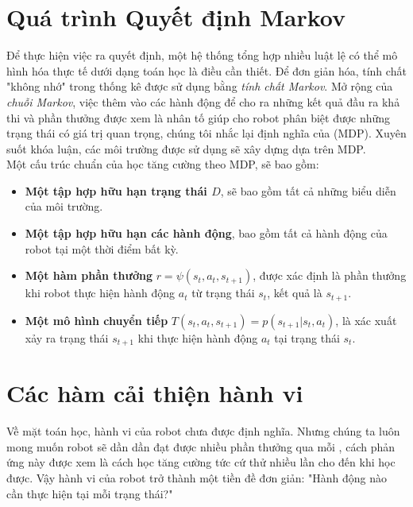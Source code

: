 \section{Quá trình Quyết định Markov}\label{MDP}
Để thực hiện việc ra quyết định, một hệ thống tổng hợp nhiều luật lệ có thể mô hình hóa thực tế dưới dạng toán học là điều cần thiết. Để đơn giản hóa, tính chất "không nhớ" trong thống kê được sử dụng bằng \textit{tính chất Markov}\cite{MarkovProperty}. Mở rộng của  \textit{chuỗi Markov}, việc thêm vào các hành động để cho ra những kết quả đầu ra khả thi và phần thưởng được xem là nhân tố giúp cho robot phân biệt được những trạng thái có giá trị quan trọng, chúng tôi nhắc lại định nghĩa của 
(MDP)\cite{AIbook}. Xuyên suốt khóa luận, các môi trường được sử dụng sẽ xây dựng  dựa trên MDP.\\
Một cấu trúc chuẩn của học tăng cường theo MDP, sẽ bao gồm:
\begin{itemize}
    \item \textbf{Một tập hợp hữu hạn trạng thái $D$}, sẽ bao gồm tất cả những biểu diễn của môi trường.
    \item \textbf{Một tập hợp hữu hạn các hành động}, bao gồm tất cả hành động của robot tại một thời điểm bất kỳ.
    \item \textbf{Một hàm phần thưởng} $r = \psi(s_t, a_t, s_{t+1})$, được xác định là phần thưởng khi robot thực hiện hành động $a_t$ từ trạng thái $s_t$, kết quả là $s_{t+1}$.
    \item \textbf{Một mô hình chuyển tiếp} $T(s_t,a_t,s_{t+1}) = p(s_{t+1}|s_t,a_t)$, là xác xuất xảy ra trạng thái $s_{t+1}$ khi thực hiện hành động $a_t$ tại trạng thái $s_t$.
\end{itemize}
\section{Các hàm cải thiện hành vi}
Về mặt toán học, hành vi của robot chưa được định nghĩa. Nhưng chúng ta luôn mong muốn robot sẽ dần dần đạt được nhiều phần thưởng qua mỗi , cách phản ứng này được xem là cách học tăng cường tức cứ thử nhiều lần cho đến khi học được. Vậy hành vi của robot trở thành một tiền đề đơn giản: "Hành động nào cần thực hiện tại mỗi trạng thái?"
